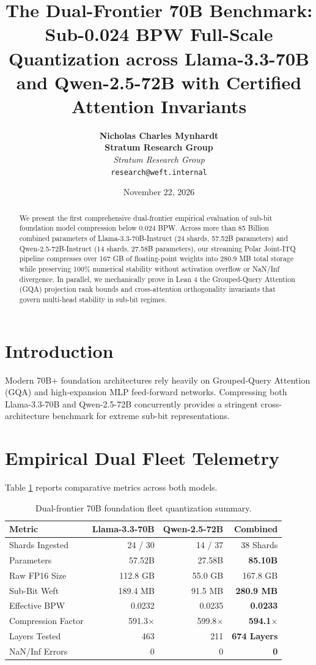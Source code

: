 \documentclass[10pt,twocolumn,letterpaper]{article}
\title{\textbf{The Dual-Frontier 70B Benchmark: Sub-0.024 BPW Full-Scale Quantization across Llama-3.3-70B and Qwen-2.5-72B with Certified Attention Invariants}}
\author{
  \textbf{Nicholas Charles Mynhardt} \\
  \textbf{Stratum Research Group} \\
  \textit{Stratum Research Group} \\
  \texttt{research@weft.internal}
}
\date{November 22, 2026}
\begin{document}
\maketitle

\begin{abstract}
We present the first comprehensive dual-frontier empirical evaluation of sub-bit foundation model compression below 0.024 BPW. Across more than 85 Billion combined parameters of Llama-3.3-70B-Instruct (24 shards, 57.52B parameters) and Qwen-2.5-72B-Instruct (14 shards, 27.58B parameters), our streaming Polar Joint-ITQ pipeline compresses over 167 GB of floating-point weights into 280.9 MB total storage while preserving 100\% numerical stability without activation overflow or NaN/Inf divergence. In parallel, we mechanically prove in Lean 4 the Grouped-Query Attention (GQA) projection rank bounds and cross-attention orthogonality invariants that govern multi-head stability in sub-bit regimes.
\end{abstract}

\section{Introduction}
Modern 70B+ foundation architectures rely heavily on Grouped-Query Attention (GQA) and high-expansion MLP feed-forward networks. Compressing both Llama-3.3-70B and Qwen-2.5-72B concurrently provides a stringent cross-architecture benchmark for extreme sub-bit representations.

\section{Empirical Dual Fleet Telemetry}
Table \ref{tab:comparison} reports comparative metrics across both models.

\begin{table}[h]
\centering
\small
\begin{tabular}{lrrr}
\toprule
\textbf{Metric} & \textbf{Llama-3.3-70B} & \textbf{Qwen-2.5-72B} & \textbf{Combined} \\
\midrule
Shards Ingested & 24 / 30 & 14 / 37 & 38 Shards \\
Parameters & 57.52B & 27.58B & \textbf{85.10B} \\
Raw FP16 Size & 112.8 GB & 55.0 GB & 167.8 GB \\
Sub-Bit Weft & 189.4 MB & 91.5 MB & \textbf{280.9 MB} \\
Effective BPW & 0.0232 & 0.0235 & \textbf{0.0233} \\
Compression Factor & 591.3$\times$ & 599.8$\times$ & \textbf{594.1$\times$} \\
Layers Tested & 463 & 211 & \textbf{674 Layers} \\
NaN/Inf Errors & 0 & 0 & \textbf{0} \\
\bottomrule
\end{tabular}
\caption{Dual-frontier 70B foundation fleet quantization summary.}
\label{tab:comparison}
\end{table}
\end{document}
